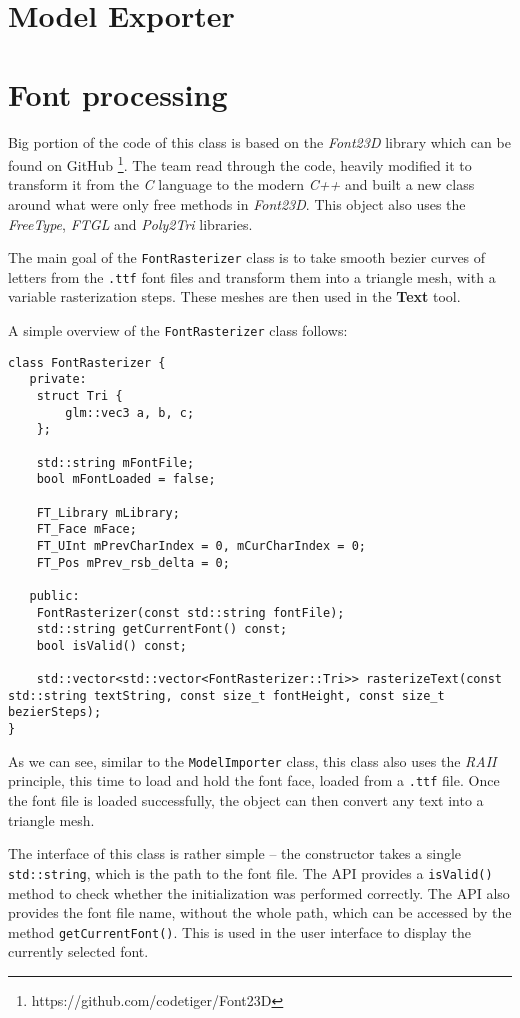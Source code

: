 \section{Model Exporter}

\section{Font processing}
\label{sec:fonts}

Big portion of the code of this class is based on the \textit{Font23D} library which can be found on GitHub \footnote{https://github.com/codetiger/Font23D}. The team read through the code, heavily modified it to transform it from the \textit{C} language to the modern \textit{C++} and built a new class around what were only free methods in \textit{Font23D}. This object also uses the \textit{FreeType}, \textit{FTGL} and \textit{Poly2Tri} libraries.

The main goal of the \texttt{FontRasterizer} class is to take smooth bezier curves of letters from the \texttt{.ttf} font files and transform them into a triangle mesh, with a variable rasterization steps. These meshes are then used in the \textbf{Text} tool.

A simple overview of the \texttt{FontRasterizer} class follows:

\begin{lstlisting}
class FontRasterizer {
   private:
	struct Tri {
        glm::vec3 a, b, c;
    };

    std::string mFontFile;
    bool mFontLoaded = false;

    FT_Library mLibrary;
    FT_Face mFace;
    FT_UInt mPrevCharIndex = 0, mCurCharIndex = 0;
    FT_Pos mPrev_rsb_delta = 0;

   public:
    FontRasterizer(const std::string fontFile);
    std::string getCurrentFont() const;
    bool isValid() const;

    std::vector<std::vector<FontRasterizer::Tri>> rasterizeText(const std::string textString, const size_t fontHeight, const size_t bezierSteps);
}
\end{lstlisting}

As we can see, similar to the \texttt{ModelImporter} class, this class also uses the \textit{RAII} principle, this time to load and hold the font face, loaded from a \texttt{.ttf} file. Once the font file is loaded successfully, the object can then convert any text into a triangle mesh.

The interface of this class is rather simple -- the constructor takes a single \texttt{std::string}, which is the path to the font file. The API provides a \texttt{isValid()} method to check whether the initialization was performed correctly. The API also provides the font file name, without the whole path, which can be accessed by the method \texttt{getCurrentFont()}. This is used in the user interface to display the currently selected font.

